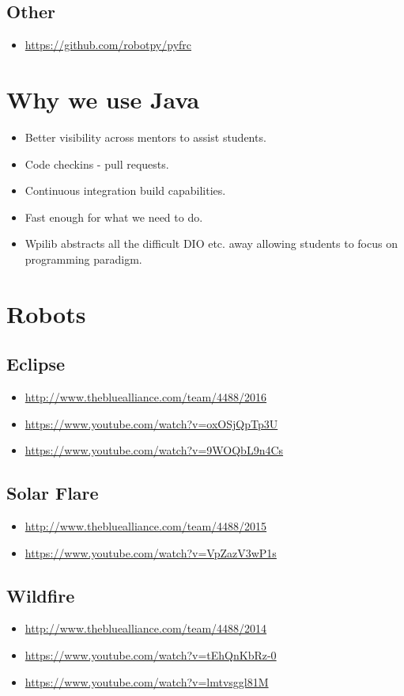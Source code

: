 \documentclass{article}
\begin{document}
\subsection{Other}
\begin{itemize}
\item[] \url{https://github.com/robotpy/pyfrc}
\end{itemize}

\section{Why we use Java}
\begin{itemize}
    \item Better visibility across mentors to assist students.
    \item Code checkins - pull requests.
    \item Continuous integration build capabilities.
    \item Fast enough for what we need to do.
    \item Wpilib abstracts all the difficult DIO etc. away allowing students to focus on programming paradigm.
\end{itemize}

\pagebreak
\section{Robots}
\subsection{Eclipse}
\begin{itemize}
\item[] \url{http://www.thebluealliance.com/team/4488/2016}
\item[] \url{https://www.youtube.com/watch?v=oxOSjQpTp3U}
\item[] \url{https://www.youtube.com/watch?v=9WOQbL9n4Cs}
\end{itemize}
\subsection{Solar Flare}
\begin{itemize}
\item[] \url{http://www.thebluealliance.com/team/4488/2015}
\item[] \url{https://www.youtube.com/watch?v=VpZazV3wP1s}
\end{itemize}
\subsection{Wildfire}
\begin{itemize}
\item[] \url{http://www.thebluealliance.com/team/4488/2014}
\item[] \url{https://www.youtube.com/watch?v=tEhQnKbRz-0}
\item[] \url{https://www.youtube.com/watch?v=lmtvsggl81M}
\end{itemize}
\end{document}
